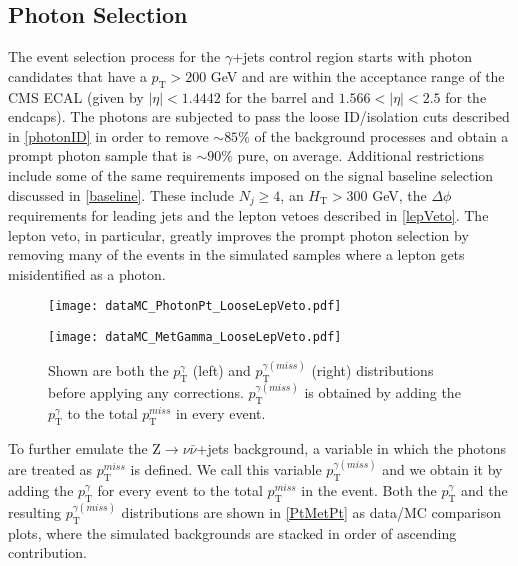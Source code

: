 \subsection{Photon Selection}
The event selection process for the $\gamma$+jets control region starts with photon candidates that have a $p_\text{T} > 200$ GeV and are within the acceptance range of the CMS ECAL (given by $|\eta| < 1.4442$ for the barrel and $1.566 < |\eta| < 2.5$ for the endcaps). The photons are subjected to pass the loose ID/isolation cuts described in \autoref{photonID} in order to remove $\sim85\%$ of the background processes and obtain a prompt photon sample that is $\sim90\%$ pure, on average. Additional restrictions include some of the same requirements imposed on the signal baseline selection discussed in \autoref{baseline}. These include $N_j \geq 4$, an $H_\text{T} > 300$ GeV, the $\Delta\phi$ requirements for leading jets and the lepton vetoes described in \autoref{lepVeto}. The lepton veto, in particular, greatly improves the prompt photon selection by removing many of the events in the simulated samples where a lepton gets misidentified as a photon.

\begin{figure}[H]
\begin{center}
\begin{minipage}[b]{0.45\textwidth}
    \texttt{[image: dataMC\_PhotonPt\_LooseLepVeto.pdf]}
\end{minipage}
\begin{minipage}[b]{0.45\textwidth}
    \texttt{[image: dataMC\_MetGamma\_LooseLepVeto.pdf]}
\end{minipage}
\end{center}
\vspace{-1em}
\caption{Shown are both the $p_\text{T}^{\gamma}$ (left) and $p_\text{T}^{\gamma (miss)}$ (right) distributions before applying any corrections. $p_\text{T}^{\gamma (miss)}$ is obtained by adding the $p_\text{T}^{\gamma}$ to the total $p_\text{T}^{miss}$ in every event.}
\label{PtMetPt}
\end{figure}
\vspace{1em}

To further emulate the Z$\rightarrow\nu\bar{\nu}$+jets background, a variable in which the photons are treated as $p_\text{T}^{miss}$ is defined. We call this variable $p_\text{T}^{\gamma (miss)}$ and we obtain it by adding the $p_\text{T}^{\gamma}$ for every event to the total $p_\text{T}^{miss}$ in the event. Both the $p_\text{T}^{\gamma}$ and the resulting $p_\text{T}^{\gamma (miss)}$ distributions are shown in \autoref{PtMetPt} as data/MC comparison plots, where the simulated backgrounds are stacked in order of ascending contribution.\\

